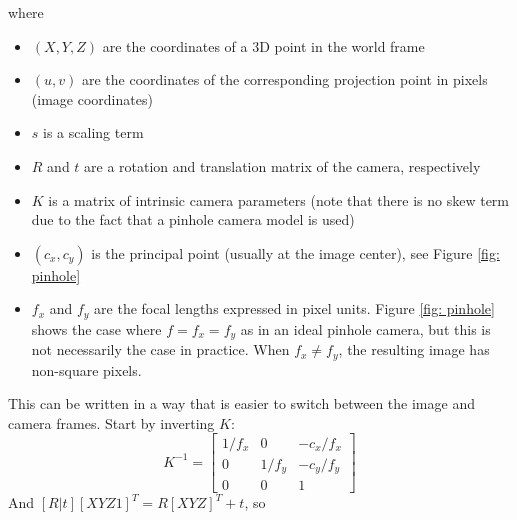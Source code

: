 \documentclass[12pt,a4paper]{article}
\begin{document}
    where 
    \begin{itemize}
      \item $(X,Y,Z)$ are the coordinates of a 3D point in the world frame
      \item $(u,v)$ are the coordinates of the corresponding projection point in pixels (image coordinates)
      \item $s$ is a scaling term
      \item $R$ and $t$ are a rotation and translation matrix of the camera, respectively
      \item $K$ is a matrix of intrinsic camera parameters (note that there is no skew term due to the fact that a pinhole camera model is used)
      \item $(c_x, c_y)$ is the principal point (usually at the image center), see Figure \ref{fig: pinhole}
      \item $f_x$ and $f_y$ are the focal lengths expressed in pixel units. Figure \ref{fig: pinhole} shows the case where $f=f_x=f_y$ as in an ideal pinhole camera, but this is not necessarily the case in practice. When $f_x \neq f_y$, the resulting image has non-square pixels.
    \end{itemize}
    This can be written in a way that is easier to switch between the image and camera frames. Start by inverting $K$:
    \[
    K^{-1} = \begin{bmatrix} 1/f_x & 0 & -c_x/f_x \\ 0 & 1/f_y & -c_y/f_y \\ 0 & 0 & 1 \end{bmatrix}
    \]
    And $[R|t] [X Y Z 1]^T = R [X Y Z]^T + t$, so
\end{document}
